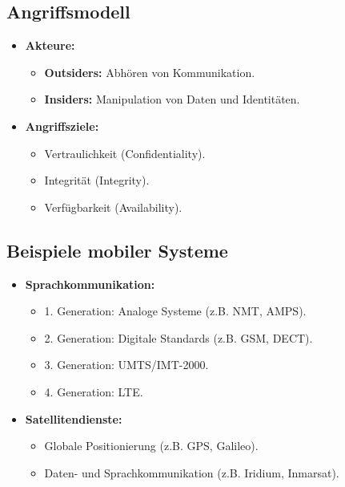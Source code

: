\documentclass{article}
\begin{document}
\subsection{Angriffsmodell}
\begin{itemize}
    \item \textbf{Akteure:}
    \begin{itemize}
        \item \textbf{Outsiders:} Abhören von Kommunikation.
        \item \textbf{Insiders:} Manipulation von Daten und Identitäten.
    \end{itemize}
    \item \textbf{Angriffsziele:}
    \begin{itemize}
        \item Vertraulichkeit (Confidentiality).
        \item Integrität (Integrity).
        \item Verfügbarkeit (Availability).
    \end{itemize}
\end{itemize}

\subsection{Beispiele mobiler Systeme}
\begin{itemize}
    \item \textbf{Sprachkommunikation:}
    \begin{itemize}
        \item 1. Generation: Analoge Systeme (z.B. NMT, AMPS).
        \item 2. Generation: Digitale Standards (z.B. GSM, DECT).
        \item 3. Generation: UMTS/IMT-2000.
        \item 4. Generation: LTE.
    \end{itemize}
    \item \textbf{Satellitendienste:}
    \begin{itemize}
        \item Globale Positionierung (z.B. GPS, Galileo).
        \item Daten- und Sprachkommunikation (z.B. Iridium, Inmarsat).
    \end{itemize}
\end{itemize}
\end{document}
